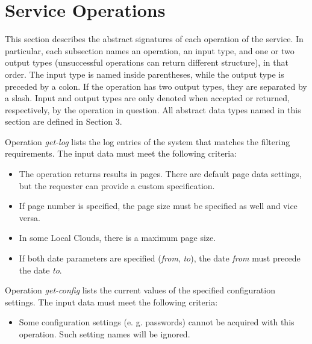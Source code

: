 \documentclass[a4paper]{arrowhead}
\begin{document}
\newpage

\section{Service Operations}
\label{sec:functions}

This section describes the abstract signatures of each operation of the service. 
In particular, each subsection names an operation, an input type, and one or two output types (unsuccessful operations can return different structure), in that order.
The input type is named inside parentheses, while the output type is preceded by a colon. If the operation has two output types, they are separated by a slash.
Input and output types are only denoted when accepted or returned, respectively, by the operation in question. All abstract data types named in this section are defined in Section 3.

{}

Operation \textit{get-log} lists the log entries of the system that matches the filtering requirements. The input data must meet the following criteria:

\begin{itemize}
    \item The operation returns results in pages. There are default page data settings, but the requester can provide a custom specification.
    \item If page number is specified, the page size must be specified as well and vice versa.
    \item In some Local Clouds, there is a maximum page size.
    \item If both date parameters are specified (\textit{from}, \textit{to}), the date \textit{from} must precede the date \textit{to}.
\end{itemize}


Operation  \textit{get-config} lists the current values of the specified configuration settings. The input data must meet the following criteria:

\begin{itemize}
    \item Some configuration settings (e. g. passwords) cannot be acquired with this operation. Such setting names will be ignored.
\end{itemize}
\end{document}
